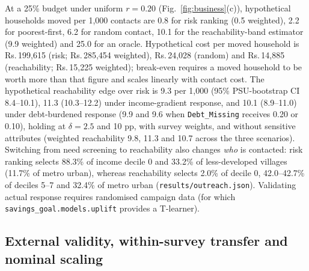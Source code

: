 \documentclass[conference]{IEEEtran}
\newcommand{\rs}{Rs.\,}
\begin{document}
At a 25\% budget under uniform $r=0.20$ (Fig.~\ref{fig:business}(c)), hypothetical households moved per 1,000 contacts are 0.8 for risk ranking (0.5 weighted), 2.2 for poorest-first, 6.2 for random contact, 10.1 for the reachability-band estimator (9.9 weighted) and 25.0 for an oracle. Hypothetical cost per moved household is \rs 199,615 (risk; \rs 285,454 weighted), \rs 24,028 (random) and \rs 14,885 (reachability; \rs 15,225 weighted); break-even requires a moved household to be worth more than that figure and scales linearly with contact cost. The hypothetical reachability edge over risk is 9.3 per 1,000 (95\% PSU-bootstrap CI 8.4--10.1), 11.3 (10.3--12.2) under income-gradient response, and 10.1 (8.9--11.0) under debt-burdened response (9.9 and 9.6 when \texttt{Debt\_Missing} receives 0.20 or 0.10), holding at $\delta = 2.5$ and 10 pp, with survey weights, and without sensitive attributes (weighted reachability 9.8, 11.3 and 10.7 across the three scenarios). Switching from need screening to reachability also changes \emph{who} is contacted: risk ranking selects 88.3\% of income decile 0 and 33.2\% of less-developed villages (11.7\% of metro urban), whereas reachability selects 2.0\% of decile 0, 42.0--42.7\% of deciles 5--7 and 32.4\% of metro urban (\texttt{results/outreach.json}). Validating actual response requires randomised campaign data (for which \texttt{savings\_goal.models.uplift} provides a T-learner).

\subsection{External validity, within-survey transfer and nominal scaling}
\end{document}
